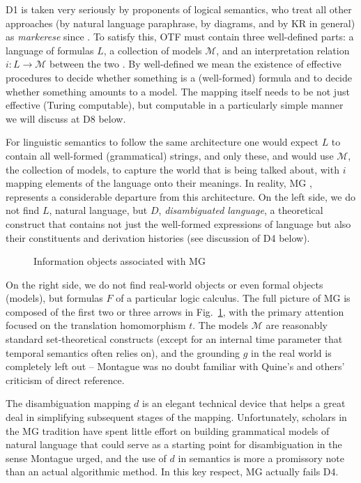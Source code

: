 \documentclass[output=paper,colorlinks=true,citecolor=brown]{langscibook}
\begin{document}
\noindent
D1 is taken very seriously by proponents of logical
semantics, who treat all other approaches (by natural language paraphrase, by
diagrams, and by KR in general) as \emph{markerese} since \citet{Lewis:1970}.
To satisfy this, OTF must contain three well-defined parts: a language of
formulas $L$, a collection of models $\mathcal{M}$, and an interpretation
relation $i: L \rightarrow \mathcal{M} $ between the two \citep{Tarski:1956}.
By well-defined we mean the existence of effective procedures to decide 
whether something is a (well-formed) formula and to decide whether something
amounts to a model. The mapping itself needs to be not just effective (Turing
computable), but computable in a particularly simple manner we will discuss at
D8 below. 

For linguistic semantics to follow the same architecture one would expect $L$
to contain all well-formed (grammatical) strings, and only these, and would
use $\mathcal{M}$, the collection of models, to capture the world that is
being talked about, with $i$ mapping elements of the language onto their
meanings.  In reality, MG \citep{Montague:1970,Montague:1973}, represents a
considerable departure from this architecture. On the left side, we do not
find $L$, natural language, but $D$, \emph{disambiguated language}, a
theoretical construct that contains not just the well-formed expressions of
language but also their constituents and derivation histories (see discussion
of D4 below).

\begin{figure}[h]
\centering
\mbox{}
\caption{Information objects associated with MG}
\label{fig:information_objects}
\end{figure}

On the right side, we do not find real-world objects or even formal objects
(models), but formulas $F$ of a particular logic calculus. The full picture of
MG is composed of the first two or three arrows in
Fig.~\ref{fig:information_objects}, with the primary attention focused on the
translation homomorphism $t$. The models $\mathcal{M}$ are reasonably standard
set-theoretical constructs (except for an internal time parameter that
temporal semantics often relies on), and the grounding $g$ in the real world
is completely left out -- Montague was no doubt familiar with Quine's and
others' criticism of direct reference.

The disambiguation mapping $d$ is an elegant technical device that helps a
great deal in simplifying subsequent stages of the mapping. Unfortunately,
scholars in the MG tradition have spent little effort on building grammatical
models of natural language that could serve as a starting point for
disambiguation in the sense Montague urged, and the use of $d$ in semantics is
more a promissory note than an actual algorithmic method. In this key respect,
MG actually fails D4.
\end{document}
